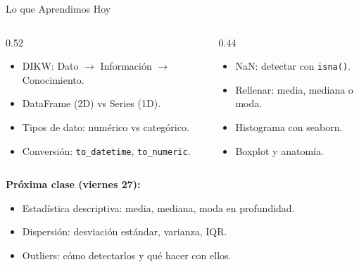 \documentclass[aspectratio=169, 11pt]{beamer}
\begin{document}
\begin{frame}{Lo que Aprendimos Hoy}
  \vspace{-4pt}
  \begin{columns}[T]
    \begin{column}{0.52\textwidth}
      {\footnotesize
      \begin{itemize}\setlength{\itemsep}{4pt}
        \item[{\color{codeGreen}\faCheckCircle}]
          DIKW: Dato $\to$ Información $\to$ Conocimiento.
        \item[{\color{codeGreen}\faCheckCircle}]
          DataFrame (2D) vs Series (1D).
        \item[{\color{codeGreen}\faCheckCircle}]
          Tipos de dato: numérico vs categórico.
        \item[{\color{codeGreen}\faCheckCircle}]
          Conversión: \texttt{to\_datetime}, \texttt{to\_numeric}.
      \end{itemize}
      }
    \end{column}

    \begin{column}{0.44\textwidth}
      {\footnotesize
      \begin{itemize}\setlength{\itemsep}{4pt}
        \item[{\color{codeGreen}\faCheckCircle}]
          NaN: detectar con \texttt{isna()}.
        \item[{\color{codeGreen}\faCheckCircle}]
          Rellenar: media, mediana o moda.
        \item[{\color{codeGreen}\faCheckCircle}]
          Histograma con seaborn.
        \item[{\color{codeGreen}\faCheckCircle}]
          Boxplot y anatomía.
      \end{itemize}
      }
    \end{column}
  \end{columns}

  \vspace{6pt}
  {\small\color{arcaDark}\bfseries Próxima clase (viernes 27):}
  \vspace{2pt}
  {\footnotesize
  \begin{itemize}\setlength{\itemsep}{2pt}
    \item[{\color{arcaRed}\faArrowRight}]
      Estadística descriptiva: media, mediana, moda en profundidad.
    \item[{\color{arcaRed}\faArrowRight}]
      Dispersión: desviación estándar, varianza, IQR.
    \item[{\color{arcaRed}\faArrowRight}]
      Outliers: cómo detectarlos y qué hacer con ellos.
  \end{itemize}
  }
\end{frame}
\end{document}
